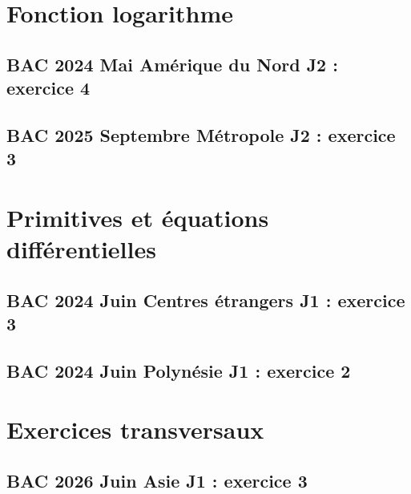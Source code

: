 \documentclass[lang=fr,edition=teacher,layout=sheet]{mxbook}
\begin{document}
\begingroup\endgroup
\par\bigskip
\clearpage\section*{Fonction logarithme}
\subsection*{BAC 2024 Mai Amérique du Nord J2 : exercice 4}
\begingroup\endgroup
\par\bigskip
{}\subsection*{BAC 2025 Septembre Métropole J2 : exercice 3}
\begingroup\endgroup
\par\bigskip
\clearpage\section*{Primitives et équations différentielles}
\subsection*{BAC 2024 Juin Centres étrangers J1 : exercice 3}
\begingroup\endgroup
\par\bigskip
{}\subsection*{BAC 2024 Juin Polynésie J1 : exercice 2}
\begingroup\endgroup
\par\bigskip
\clearpage\section*{Exercices transversaux}
\subsection*{BAC 2026 Juin Asie J1 : exercice 3}
\end{document}
